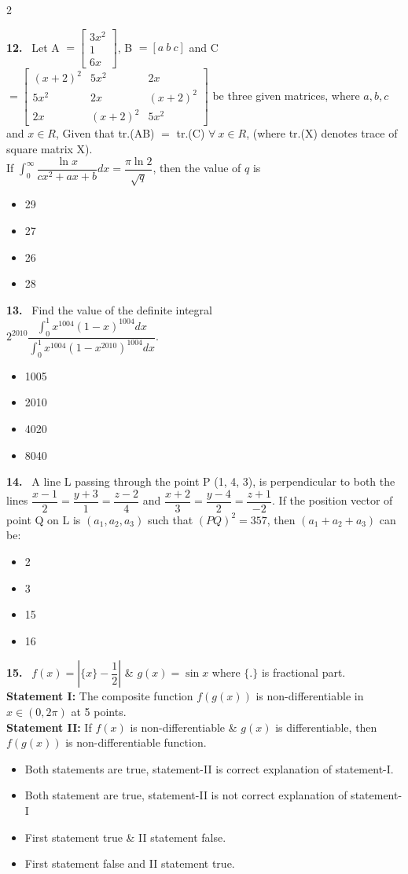 \documentclass[10pt]{extarticle}
\newcommand{\qn}[1]{\par\smallskip\noindent\textbf{#1.}~}
\newenvironment{qoptions}{\begin{itemize}[leftmargin=1.8em,itemsep=1pt,topsep=2pt,label={}]}{\end{itemize}}
\newcommand{\opt}[2]{\item[(#1)] #2}
\begin{document}
\begin{multicols}{2}
\qn{12} Let A $=\begin{bmatrix}3x^2\\1\\6x\end{bmatrix}$, B $=[a\ b\ c]$ and C $=\begin{bmatrix}(x+2)^2&5x^2&2x\\5x^2&2x&(x+2)^2\\2x&(x+2)^2&5x^2\end{bmatrix}$ be three given matrices, where $a,b,c$ and $x\in R$, Given that tr.(AB) $=$ tr.(C) $\forall\ x\in R$, (where tr.(X) denotes trace of square matrix X).\\
If $\displaystyle\int_0^\infty\dfrac{\ln x}{cx^2+ax+b}dx=\dfrac{\pi\ln2}{\sqrt q}$, then the value of $q$ is
\begin{qoptions}
\opt{A}{29}
\opt{B}{27}
\opt{C}{26}
\opt{D}{28}
\end{qoptions}

\qn{13} Find the value of the definite integral\\
$2^{2010}\dfrac{\displaystyle\int_0^1x^{1004}(1-x)^{1004}dx}{\displaystyle\int_0^1x^{1004}\left(1-x^{2010}\right)^{1004}dx}$.
\begin{qoptions}
\opt{A}{1005}
\opt{B}{2010}
\opt{C}{4020}
\opt{D}{8040}
\end{qoptions}

\qn{14} A line L passing through the point P (1, 4, 3), is perpendicular to both the lines $\dfrac{x-1}2=\dfrac{y+3}1=\dfrac{z-2}4$ and $\dfrac{x+2}3=\dfrac{y-4}2=\dfrac{z+1}{-2}$. If the position vector of point Q on L is $(a_1,a_2,a_3)$ such that $(PQ)^2=357$, then $(a_1+a_2+a_3)$ can be:
\begin{qoptions}
\opt{A}{2}
\opt{B}{3}
\opt{C}{15}
\opt{D}{16}
\end{qoptions}

\qn{15} $f(x)=\left|\{x\}-\dfrac12\right|$ \& $g(x)=\sin x$ where $\{.\}$ is fractional part.\\
\textbf{Statement I:} The composite function $f(g(x))$ is non-differentiable in $x\in(0,2\pi)$ at 5 points.\\
\textbf{Statement II:} If $f(x)$ is non-differentiable \& $g(x)$ is differentiable, then $f(g(x))$ is non-differentiable function.
\begin{qoptions}
\opt{A}{Both statements are true, statement-II is correct explanation of statement-I.}
\opt{B}{Both statement are true, statement-II is not correct explanation of statement-I}
\opt{C}{First statement true \& II statement false.}
\opt{D}{First statement false and II statement true.}
\end{qoptions}


\end{multicols}
\end{document}
